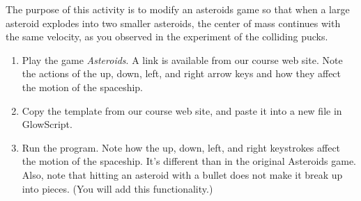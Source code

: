 
\apparatus
{}

\longgoal

The purpose of this activity is to modify an asteroids game so that when a large asteroid explodes into two smaller asteroids, the center of mass continues with the same velocity, as you observed in the experiment of the colliding pucks.

\procedure


\begin{enumerate}

\subsection*{Playing Asteroids}

\item Play the game \emph{Asteroids}.  A link is available from our course web site. Note the actions of the up, down, left, and right arrow keys and how they affect the motion of the spaceship.

\item Copy the template from our course web site, and paste it into a new file in GlowScript.

\item Run the program. Note how the up, down, left, and right keystrokes affect the motion of the spaceship. It's different than in the original Asteroids game. Also, note that hitting an asteroid with a bullet does not make it break up into pieces. (You will add this functionality.)


\end{enumerate}
